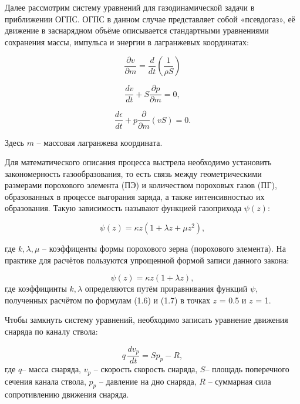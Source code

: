 \documentclass[14pt, a4paper]{report} %
\begin{document}
Далее рассмотрим систему уравнений для газодинамической задачи в приближении ОГПС. ОГПС в данном случае представляет собой «псевдогаз», её движение в заснарядном
объёме описывается стандартными уравнениями сохранения массы, импульса и энергии в лагранжевых координатах: 

\begin{equation}
\frac{\partial v}{\partial m} = \frac{d}{dt}\left(\frac{1}{\rho S}\right)
\end{equation}

\begin{equation}
\frac{dv}{dt} + S\frac{\partial p}{\partial m} = 0,
\end{equation}

\begin{equation}
\frac{d\epsilon}{dt} + p\frac{\partial}{\partial m}(vS) = 0.
\end{equation}

Здесь $m$ -- массовая лагранжева координата.

Для математического описания процесса выстрела необходимо установить закономерность газообразования, то есть связь между геометрическими размерами порохового элемента (ПЭ) и количеством пороховых газов (ПГ), образованных в процессе выгорания заряда, а также интенсивностью их образования. Такую зависимость называют функцией газоприхода $\psi(z)$:

\begin{equation}
\psi(z) = \kappa z (1 + \lambda z + \mu z^2),
\end{equation}

где $k, \lambda, \mu$ -- коэффиценты формы порохового зерна (порохового элемента).
На практике для расчётов пользуются упрощенной формой записи данного закона:

\begin{equation}
\psi(z) = \kappa z (1 + \lambda z),
\end{equation}
где коэффицинты $k, \lambda$ определяются путём приравнивания функций $\psi$, полученных расчётом по формулам (1.6) и (1.7) в точках $z$ = 0.5 и $z$ = 1.

Чтобы замкнуть систему уравнений, необходимо записать уравнение движения снаряда по каналу ствола:

\begin{equation}
q \, \frac{d v_{p}}{d t} = S p_{p} - R,
\end{equation}
где $q$-- масса снаряда, $v_p$ -- скорость скорость снаряда, $S$-- площадь поперечного сечения канала ствола, $ p_{p}$ -- давление на дно снаряда, $R$ -- суммарная сила сопротивлению движения снаряда. 
\end{document}
